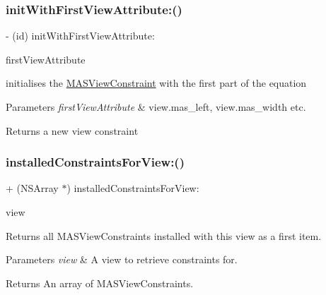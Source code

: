 \subsubsection{\texorpdfstring{init\+With\+First\+View\+Attribute\+:()}{initWithFirstViewAttribute:()}}
{\footnotesize\ttfamily -\/ (id) init\+With\+First\+View\+Attribute\+: \begin{DoxyParamCaption}\item[{(\mbox{\hyperlink{interface_m_a_s_view_attribute}{M\+A\+S\+View\+Attribute}} $\ast$)}]{first\+View\+Attribute }\end{DoxyParamCaption}}

initialises the \mbox{\hyperlink{interface_m_a_s_view_constraint}{M\+A\+S\+View\+Constraint}} with the first part of the equation


\begin{DoxyParams}{Parameters}
{\em first\+View\+Attribute} & view.\+mas\+\_\+left, view.\+mas\+\_\+width etc.\\
\hline
\end{DoxyParams}
\begin{DoxyReturn}{Returns}
a new view constraint 
\end{DoxyReturn}
\mbox{\label{interface_m_a_s_view_constraint_a947764dff6608eefae24c46f6c21ed4e}} 
\subsubsection{\texorpdfstring{installed\+Constraints\+For\+View\+:()}{installedConstraintsForView:()}}
{\footnotesize\ttfamily + (N\+S\+Array $\ast$) installed\+Constraints\+For\+View\+: \begin{DoxyParamCaption}\item[{(M\+A\+S\+\_\+\+V\+I\+EW $\ast$)}]{view }\end{DoxyParamCaption}}

Returns all M\+A\+S\+View\+Constraints installed with this view as a first item.


\begin{DoxyParams}{Parameters}
{\em view} & A view to retrieve constraints for.\\
\hline
\end{DoxyParams}
\begin{DoxyReturn}{Returns}
An array of M\+A\+S\+View\+Constraints. 
\end{DoxyReturn}


